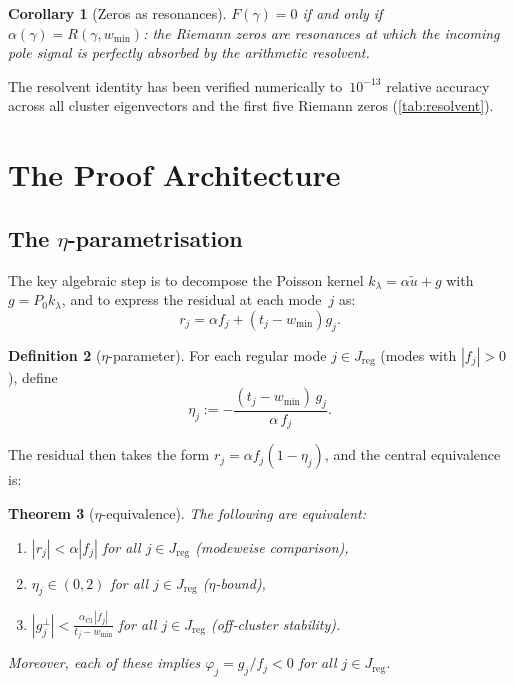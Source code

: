 \documentclass[12pt,a4paper]{article}
\newtheorem{theorem}{Theorem}[section]
\newtheorem{corollary}[theorem]{Corollary}
\theoremstyle{definition}
\newtheorem{definition}[theorem]{Definition}
\theoremstyle{remark}
\newcommand{\Cl}{\mathrm{Cl}}
\newcommand{\reg}{\mathrm{reg}}
\newcommand{\utilde}{\tilde{u}}
\newcommand{\wmin}{w_{\min}}
\begin{document}
\begin{corollary}[Zeros as resonances]
$F(\gamma) = 0$ if and only if $\alpha(\gamma) = R(\gamma, \wmin)$:
the Riemann zeros are \emph{resonances} at which the incoming pole
signal is perfectly absorbed by the arithmetic resolvent.
\end{corollary}

The resolvent identity has been verified numerically to~$10^{-13}$
relative accuracy across all cluster eigenvectors and the first five
Riemann zeros (\cref{tab:resolvent}).

\section{The Proof Architecture}
\label{sec:proof-arch}

\subsection{The \texorpdfstring{$\eta$}{eta}-parametrisation}

The key algebraic step is to decompose the Poisson kernel
$k_\lambda = \alpha \utilde + g$ with $g = P_0 k_\lambda$,
and to express the residual at each mode~$j$ as:
\begin{equation}
\label{eq:residual}
r_j = \alpha f_j + (t_j - \wmin) g_j.
\end{equation}

\begin{definition}[$\eta$-parameter]
For each regular mode $j \in J_{\reg}$ (modes with $|f_j| > 0$), define
\begin{equation}
\label{eq:eta-def}
\eta_j := -\frac{(t_j - \wmin)\, g_j}{\alpha\, f_j}.
\end{equation}
\end{definition}

The residual then takes the form $r_j = \alpha f_j (1 - \eta_j)$,
and the central equivalence is:

\begin{theorem}[$\eta$-equivalence]
\label{thm:eta-equiv}
The following are equivalent:
\begin{enumerate}[label=(\alph*)]
\item $|r_j| < \alpha |f_j|$ for all $j \in J_{\reg}$
  \hfill (modeweise comparison),
\item $\eta_j \in (0, 2)$ for all $j \in J_{\reg}$
  \hfill ($\eta$-bound),
\item $|g_j^\perp| < \frac{\alpha_{\Cl}\, |f_j|}{t_j - \wmin}$
  for all $j \in J_{\reg}$
  \hfill (off-cluster stability).
\end{enumerate}
Moreover, each of these implies $\varphi_j = g_j / f_j < 0$ for all
$j \in J_{\reg}$.
\end{theorem}
\end{document}
